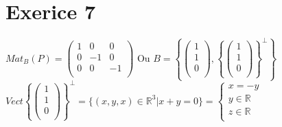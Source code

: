\documentclass{article}
\author{Frederic Becerril}
\begin{document}
\part*{Exerice 7}

$Mat_B(P) = \begin{pmatrix}
    1 & 0 & 0\\
    0 & -1 & 0\\
    0 & 0 & -1\\
\end{pmatrix}$
Ou $B = \left\{\begin{pmatrix}
    1\\
    1\\
    0\\
\end{pmatrix}, \left\{\begin{pmatrix}
    1\\
    1\\
    0\\
\end{pmatrix}
\right\}^\perp\right\}$\\
$Vect\left\{\begin{pmatrix}
    1\\
    1\\
    0\\
\end{pmatrix}\right\}^\perp = \{(x, y, x) \in \mathbb{R}^3 | x + y = 0\} = \left\{
    \begin{array}{ll}
        x = -y\\
        y \in \mathbb{R}\\
        z \in \mathbb{R}\\        
    \end{array}
    \right.$\\
\end{document}
